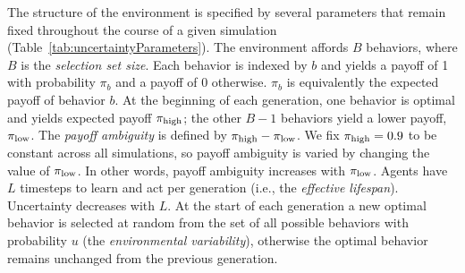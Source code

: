 \documentclass[letterpaper,11.5pt]{scrartcl}
\begin{document}
The structure of the environment is specified by several parameters that remain fixed throughout the course of a given simulation (Table~\ref{tab:uncertaintyParameters}).  %
The environment affords $B$ behaviors, where
$B$ is the \emph{selection set size}.
Each behavior is indexed by $b$ and 
yields a payoff 
of 1 with probability $\pi_b$ and a payoff of 0 otherwise. %
$\pi_b$ is equivalently the expected
payoff of behavior $b$.  
At the beginning of each generation, one behavior is optimal and yields expected
payoff $\pi_{\mathrm{high}}$; the other $B-1$ behaviors yield a lower payoff, $\pi_{\mathrm{low}}$. 
The \emph{payoff ambiguity} is defined by $\pi_{\mathrm{high}} - \pi_{\mathrm{low}}$. 
We fix $\pi_{\mathrm{high}} = 0.9$ to be constant across all simulations, so 
payoff ambiguity is varied by changing the value of $\pi_{\mathrm{low}}$. In other words, payoff ambiguity increases with $\pi_{\mathrm{low}}$.  Agents have $L$ timesteps to learn and act per generation (i.e., the \emph{effective lifespan}). Uncertainty decreases with $L$. At the start of each generation a new optimal behavior is selected at random from the set of all possible behaviors with probability $u$ (the \emph{environmental variability}), otherwise the optimal behavior remains unchanged from the previous generation. 
\end{document}

